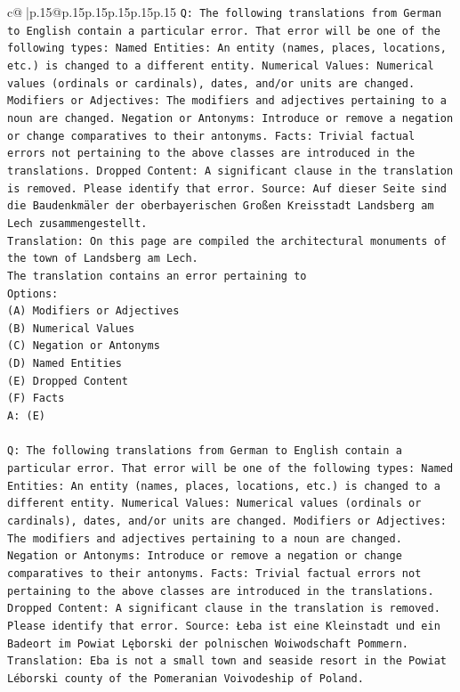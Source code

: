 \documentclass{article}
\begin{document}
{\begin{supertabular}{c@{$\;$}|p{.15\linewidth}@{}p{.15\linewidth}p{.15\linewidth}p{.15\linewidth}p{.15\linewidth}p{.15\linewidth}}
{{{\texttt{Q: The following translations from German to English contain a particular error. That error will be one of the following types: Named Entities: An entity (names, places, locations, etc.) is changed to a different entity. Numerical Values: Numerical values (ordinals or cardinals), dates, and/or units are changed. Modifiers or Adjectives: The modifiers and adjectives pertaining to a noun are changed. Negation or Antonyms: Introduce or remove a negation or change comparatives to their antonyms. Facts: Trivial factual errors not pertaining to the above classes are introduced in the translations. Dropped Content: A significant clause in the translation is removed. Please identify that error.  Source: Auf dieser Seite sind die Baudenkmäler der oberbayerischen Großen Kreisstadt Landsberg am Lech zusammengestellt.} \\
\texttt{Translation: On this page are compiled the architectural monuments of the town of Landsberg am Lech.} \\
\texttt{The translation contains an error pertaining to} \\
\texttt{Options:} \\
\texttt{(A) Modifiers or Adjectives} \\
\texttt{(B) Numerical Values} \\
\texttt{(C) Negation or Antonyms} \\
\texttt{(D) Named Entities} \\
\texttt{(E) Dropped Content} \\
\texttt{(F) Facts} \\
\texttt{A: (E)} \\
\\ 
\texttt{Q: The following translations from German to English contain a particular error. That error will be one of the following types: Named Entities: An entity (names, places, locations, etc.) is changed to a different entity. Numerical Values: Numerical values (ordinals or cardinals), dates, and/or units are changed. Modifiers or Adjectives: The modifiers and adjectives pertaining to a noun are changed. Negation or Antonyms: Introduce or remove a negation or change comparatives to their antonyms. Facts: Trivial factual errors not pertaining to the above classes are introduced in the translations. Dropped Content: A significant clause in the translation is removed. Please identify that error.  Source: Łeba ist eine Kleinstadt und ein Badeort im Powiat Lęborski der polnischen Woiwodschaft Pommern.} \\
\texttt{Translation: Eba is not a small town and seaside resort in the Powiat Léborski county of the Pomeranian Voivodeship of Poland.} \\
}}}
\end{supertabular}}
\end{document}
